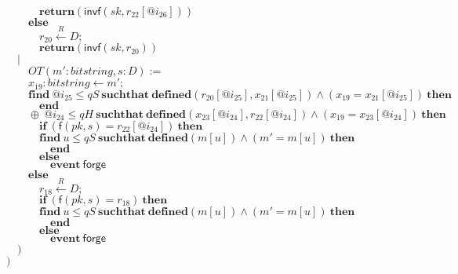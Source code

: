 \documentclass{article}
\newcommand{\store}{\leftarrow}
\newcommand{\getR}{\stackrel{R}{\store}}
\newcommand{\kw}[1]{\mathbf{#1}}
\newcommand{\kwf}[1]{\mathsf{#1}}
\newcommand{\var}[1]{\mathit{#1}}
\newcommand{\kwt}[1]{\mathit{#1}}
\newcommand{\kwp}[1]{\mathit{#1}}
\begin{document}
\begin{tabbing}
$\quad \quad \quad \kw{return}\kwf{}(\kwf{invf}(\var{sk}, \var{r}_{22}[\var{@i}_{26}]))$\\
$\quad \quad \kw{else}$\\
$\quad \quad \quad \var{r}_{20} \getR \kwt{D};$\\
$\quad \quad \quad \kw{return}\kwf{}(\kwf{invf}(\var{sk}, \var{r}_{20}))$\\
$\quad |$\\
$\quad \quad OT(\var{m'}: \kwt{bitstring}, \var{s}: \kwt{D}) :=$\\
$\quad \quad \var{x}_{19}: \kwt{bitstring} \store \var{m'};$\\
$\quad \quad \kw{find}\ \var{@i}_{25} \leq \kwp{qS}\ \kw{suchthat}\ \kw{defined}(\var{r}_{20}[\var{@i}_{25}], \var{x}_{21}[\var{@i}_{25}])\wedge (\var{x}_{19}  =  \var{x}_{21}[\var{@i}_{25}])\ \kw{then}$\\
$\quad \quad \quad \kw{end}$\\
$\quad \quad \oplus\ \var{@i}_{24} \leq \kwp{qH}\ \kw{suchthat}\ \kw{defined}(\var{x}_{23}[\var{@i}_{24}], \var{r}_{22}[\var{@i}_{24}])\wedge (\var{x}_{19}  =  \var{x}_{23}[\var{@i}_{24}])\ \kw{then}$\\
$\quad \quad \quad \kw{if}\ (\kwf{f}(\var{pk}, \var{s})  =  \var{r}_{22}[\var{@i}_{24}])\ \kw{then}$\\
$\quad \quad \quad \kw{find}\ \var{u} \leq \kwp{qS}\ \kw{suchthat}\ \kw{defined}(\var{m}[\var{u}])\wedge (\var{m'}  =  \var{m}[\var{u}])\ \kw{then}$\\
$\quad \quad \quad \quad \kw{end}$\\
$\quad \quad \quad \kw{else}$\\
$\quad \quad \quad \quad \kw{event}\ \kwf{forge}$\\
$\quad \quad \kw{else}$\\
$\quad \quad \quad \var{r}_{18} \getR \kwt{D};$\\
$\quad \quad \quad \kw{if}\ (\kwf{f}(\var{pk}, \var{s})  =  \var{r}_{18})\ \kw{then}$\\
$\quad \quad \quad \kw{find}\ \var{u} \leq \kwp{qS}\ \kw{suchthat}\ \kw{defined}(\var{m}[\var{u}])\wedge (\var{m'}  =  \var{m}[\var{u}])\ \kw{then}$\\
$\quad \quad \quad \quad \kw{end}$\\
$\quad \quad \quad \kw{else}$\\
$\quad \quad \quad \quad \kw{event}\ \kwf{forge}$\\
$\quad )$\\
$)$\\

\end{tabbing}
\end{document}
